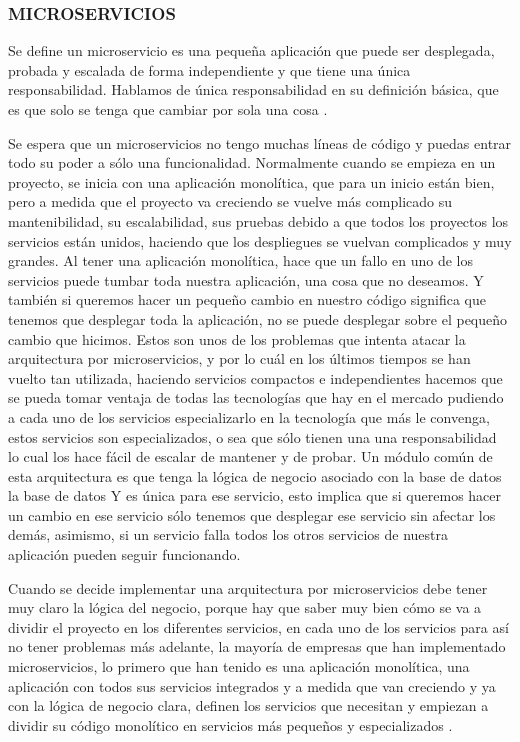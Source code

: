 \subsubsection{\textbf{MICROSERVICIOS}}
Se define un microservicio es una pequeña aplicación que puede ser desplegada, probada y escalada de forma independiente y que tiene una única responsabilidad\cite{7030212}. Hablamos de única responsabilidad en su definición básica, que es que solo se tenga que cambiar por sola una cosa \cite{Martin:2008:CCH:1388398}.


Se espera que un microservicios no tengo muchas líneas de código y puedas entrar todo su poder a sólo una funcionalidad. Normalmente cuando se empieza en un proyecto, se inicia con una aplicación monolítica, que para un inicio están bien, pero a medida que el proyecto va creciendo se vuelve más complicado su mantenibilidad, su escalabilidad, sus pruebas debido a que todos los proyectos los servicios están unidos, haciendo que los despliegues se vuelvan complicados y muy grandes. Al tener una aplicación monolítica, hace que un fallo en uno de los servicios puede tumbar toda nuestra aplicación, una cosa que no deseamos. Y también si queremos hacer un pequeño cambio en nuestro código significa que tenemos que desplegar toda la aplicación, no se puede desplegar sobre el pequeño cambio que hicimos. Estos son unos de los problemas que intenta atacar la arquitectura por microservicios, y por lo cuál en los últimos tiempos se han vuelto tan utilizada, haciendo servicios compactos e independientes hacemos que se pueda tomar ventaja de todas las tecnologías que hay en el mercado pudiendo a cada uno de los servicios especializarlo en la tecnología que más le convenga, estos servicios son especializados, o sea que sólo tienen una una responsabilidad lo cual los hace fácil de escalar de mantener y de probar. Un módulo común de esta arquitectura es que tenga la lógica de negocio asociado con la base de datos la base de datos Y es única para ese servicio, esto implica que si queremos hacer un cambio en ese servicio sólo tenemos que desplegar ese servicio sin afectar los demás, asimismo, si un servicio falla todos los otros servicios de nuestra aplicación pueden seguir funcionando.


Cuando se decide implementar una arquitectura por microservicios debe tener muy claro la lógica del negocio, porque hay que saber muy bien cómo se va a dividir el proyecto en los diferentes servicios, en cada uno de los servicios para así no tener problemas más adelante, la mayoría de empresas que han implementado microservicios, lo primero que han tenido es una aplicación monolítica, una aplicación con todos sus servicios integrados y a medida que van creciendo y ya con la lógica de negocio clara, definen los servicios que necesitan y empiezan a dividir su código monolítico en servicios más pequeños y especializados \cite{Dragoni2017}. 

